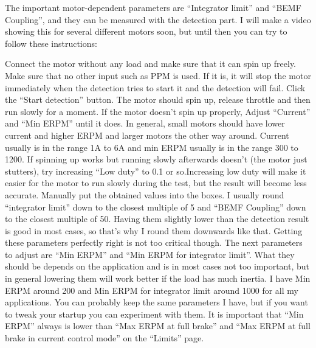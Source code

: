 \documentclass[11pt]{article}
\begin{document}
The important motor-dependent parameters are “Integrator limit” and “BEMF Coupling”, and they can be measured with the detection part. I will make a video showing this for several different motors soon, but until then you can try to follow these instructions:\newline

Connect the motor without any load and make sure that it can spin up freely.\newline
Make sure that no other input such as PPM is used. If it is, it will stop the motor immediately when the detection tries to start it and the detection will fail.\newline
Click the “Start detection” button. The motor should spin up, release throttle and then run slowly for a moment.\newline
If the motor doesn’t spin up properly, Adjust “Current” and “Min ERPM” until it does. In general, small motors should have lower current and higher ERPM and larger motors the other way around. Current usually is in the range 1A to 6A and min ERPM usually is in the range 300 to 1200.\newline
If spinning up works but running slowly afterwards doesn’t (the motor just stutters), try increasing “Low duty” to 0.1 or so.\newline Increasing low duty will make it easier for the motor to run slowly during the test, but the result will become less accurate.\newline
Manually put the obtained values into the boxes. I usually round “integrator limit” down to the closest multiple of 5 and “BEMF Coupling” down to the closest multiple of 50. Having them slightly lower than the detection result is good in most cases, so that’s why I round them downwards like that. Getting these parameters perfectly right is not too critical though.\newline
The next parameters to adjust are “Min ERPM” and “Min ERPM for integrator limit”.\newline
What they should be depends on the application and is in most cases not too important, but in general lowering them will work better if the load has much inertia. I have Min ERPM around 200 and Min ERPM for integrator limit around 1000 for all my applications.\newline
You can probably keep the same parameters I have, but if you want to tweak your startup you can experiment with them.
It is important that “Min ERPM” always is lower than “Max ERPM at full brake” and “Max ERPM at full brake in current control mode” on the “Limits” page.\newline
\end{document}
